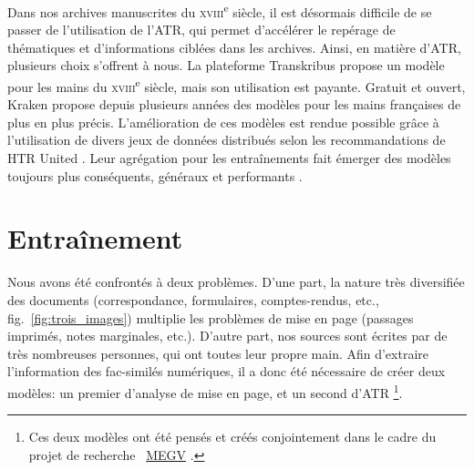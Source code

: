 \documentclass[final, fra]{anthology-ch}     %
\begin{document}
Dans nos archives manuscrites du \textsc{xviii}\textsuperscript{e} siècle, il est désormais difficile de se passer de l’utilisation de l'ATR, qui permet d’accélérer le repérage de thématiques et d’informations ciblées dans les archives. Ainsi, en matière d’ATR, plusieurs choix s’offrent à nous. La plateforme Transkribus \cite{transkribus-a-service-plateform} propose un modèle pour les mains du \textsc{xviii}\textsuperscript{e} siècle, mais son utilisation est payante. Gratuit et ouvert, Kraken \cite{escriptorium-an-open-source-platform} propose depuis plusieurs années des modèles pour les mains françaises de plus en plus précis. L’amélioration de ces modèles est rendue possible grâce à l’utilisation de divers jeux de données distribués selon les recommandations de HTR United \cite{htr-united-a-solution-towards-a-common}. Leur agrégation pour les entraînements fait émerger des modèles toujours plus conséquents, généraux et performants \cite{vers-un-modele-diachronique-pour-les-mains-modernes-françaises,transcribing-western-modern-manuscripts}.

\section{Entraînement}

Nous avons été confrontés à deux problèmes. D'une part, la nature très diversifiée des documents (correspondance, formulaires, comptes-rendus, etc., fig.~\ref{fig:trois_images}) multiplie les problèmes de mise en page (passages imprimés, notes marginales, etc.). D'autre part, nos sources sont écrites par de très nombreuses personnes, qui ont toutes leur propre main. Afin d'extraire l'information des fac-similés numériques, il a donc été nécessaire de créer deux modèles: un premier d'analyse de mise en page, et un second d'ATR \footnote{Ces deux modèles ont été pensés et créés conjointement dans le cadre du projet de recherche ~\href{https://github.com/Masculinites-Esclavagistes/MEGV-FR-MSS-18}{MEGV}
.}.
\end{document}

